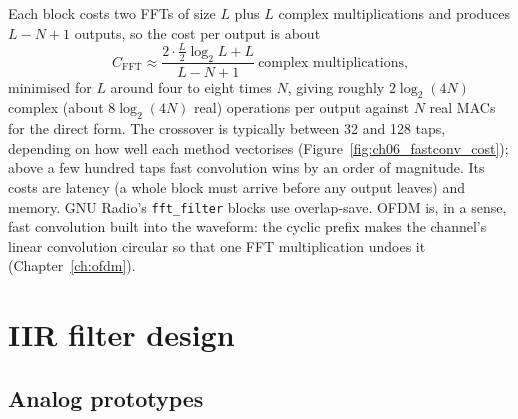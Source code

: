 Each block costs two FFTs of size $L$ plus $L$ complex multiplications and produces $L-N+1$
outputs, so the cost per output is about
\begin{equation}
C_{\text{FFT}}\approx\frac{2\cdot\frac{L}{2}\log_2L+L}{L-N+1}\ \text{complex multiplications,}
\end{equation}
minimised for $L$ around four to eight times $N$, giving roughly $2\log_2(4N)$ complex (about
$8\log_2(4N)$ real) operations per output against $N$ real MACs for the direct form. The crossover is
typically between 32 and 128 taps, depending on how well each method vectorises
(Figure~\ref{fig:ch06_fastconv_cost}); above a few hundred taps fast convolution wins by an order of
magnitude. Its costs are latency (a whole block must arrive before any output leaves) and memory.
GNU Radio's \texttt{fft\_filter} blocks use overlap-save. OFDM is, in a sense, fast convolution built
into the waveform: the cyclic prefix makes the channel's linear convolution circular so that one FFT
multiplication undoes it (Chapter~\ref{ch:ofdm}).


\section{IIR filter design}
\label{sec:ch06:iir}

\subsection{Analog prototypes}

